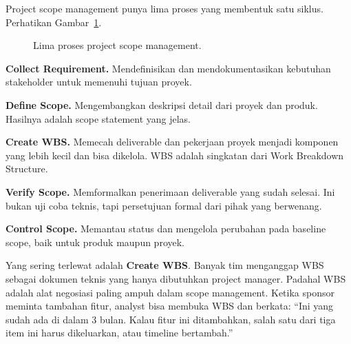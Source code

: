 \documentclass[11pt,a4paper]{article}
\begin{document}
Project scope management punya lima proses yang membentuk satu siklus. Perhatikan Gambar~\ref{fig:five-processes}.

\begin{figure}[H]
	\centering
	\caption{Lima proses project scope management.}
	\label{fig:five-processes}
\end{figure}

\textbf{Collect Requirement.} Mendefinisikan dan mendokumentasikan kebutuhan stakeholder untuk memenuhi tujuan proyek.

\textbf{Define Scope.} Mengembangkan deskripsi detail dari proyek dan produk. Hasilnya adalah scope statement yang jelas.

\textbf{Create WBS.} Memecah deliverable dan pekerjaan proyek menjadi komponen yang lebih kecil dan bisa dikelola. WBS adalah singkatan dari Work Breakdown Structure.

\textbf{Verify Scope.} Memformalkan penerimaan deliverable yang sudah selesai. Ini bukan uji coba teknis, tapi persetujuan formal dari pihak yang berwenang.

\textbf{Control Scope.} Memantau status dan mengelola perubahan pada baseline scope, baik untuk produk maupun proyek.

Yang sering terlewat adalah \textbf{Create WBS}. Banyak tim menganggap WBS sebagai dokumen teknis yang hanya dibutuhkan project manager. Padahal WBS adalah alat negosiasi paling ampuh dalam scope management. Ketika sponsor meminta tambahan fitur, analyst bisa membuka WBS dan berkata: ``Ini yang sudah ada di dalam 3 bulan. Kalau fitur ini ditambahkan, salah satu dari tiga item ini harus dikeluarkan, atau timeline bertambah.''
\end{document}
